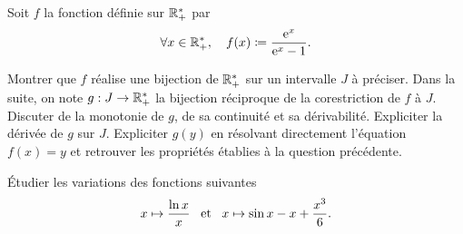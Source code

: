 \documentclass{magnolia}
\begin{document}















Soit $f$ la fonction définie sur $\mathbb{R}_+^*$ par
\[\forall x\in\mathbb{R}_+^*,\quad f(x)\coloneqq\frac{{\rm e}^x}{{\rm e}^x-1}.\]
\begin{questions}
\question Montrer que $f$ réalise une bijection de $\mathbb{R}_+^*$ sur un intervalle $J$ à préciser.
\enonce Dans la suite, on note $g:J\to\mathbb{R}_+^*$ la bijection réciproque de la corestriction de $f$
  à $J$.
\question Discuter de la monotonie de $g$, de sa continuité et sa dérivabilité. Expliciter
  la dérivée de $g$ sur $J$.
\question Expliciter $g(y)$ en résolvant directement l'équation $f(x)=y$ et retrouver les
  propriétés établies à la question précédente.
\end{questions}


Étudier les variations des fonctions suivantes
\[x\mapsto\frac{\ln x}{x} \quad\!\text{et}\quad\! x\mapsto\sin x-x+\frac{x^3}{6}.\]

\end{document}
